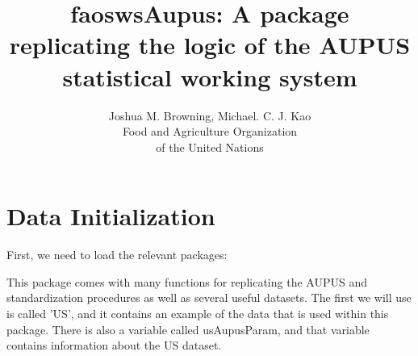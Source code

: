\documentclass[nojss]{jss}
\title{\bf faoswsAupus: A package replicating the logic of the AUPUS
statistical working system}
\author{Joshua M. Browning, Michael. C. J. Kao\\ Food and Agriculture
    Organization \\ of the United Nations\\}
\begin{document}
\section{Data Initialization}

First, we need to load the relevant packages:

\begin{knitrout}
\color{fgcolor}\begin{kframe}
\begin{alltt}
\end{alltt}
\end{kframe}
\end{knitrout}

This package comes with many functions for replicating the AUPUS and 
standardization procedures as well as several useful datasets.  The first we
will use is called 'US', and it contains an example of the data that is used
within this package.  There is also a variable called usAupusParam, and that
variable contains information about the US dataset.
\end{document}
